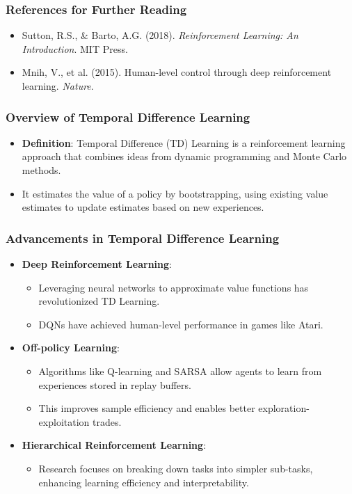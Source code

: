 \documentclass[aspectratio=169]{beamer}
\begin{document}
\begin{frame}[fragile]
    \frametitle{References for Further Reading}
    \begin{itemize}
        \item Sutton, R.S., \& Barto, A.G. (2018). \textit{Reinforcement Learning: An Introduction}. MIT Press.
        \item Mnih, V., et al. (2015). Human-level control through deep reinforcement learning. \textit{Nature}.
    \end{itemize}
\end{frame}

\begin{frame}[fragile]
    \frametitle{Overview of Temporal Difference Learning}
    \begin{itemize}
        \item \textbf{Definition}: Temporal Difference (TD) Learning is a reinforcement learning approach that combines ideas from dynamic programming and Monte Carlo methods.
        \item It estimates the value of a policy by bootstrapping, using existing value estimates to update estimates based on new experiences.
    \end{itemize}
\end{frame}

\begin{frame}[fragile]
    \frametitle{Advancements in Temporal Difference Learning}
    \begin{itemize}
        \item \textbf{Deep Reinforcement Learning}: 
        \begin{itemize}
            \item Leveraging neural networks to approximate value functions has revolutionized TD Learning. 
            \item DQNs have achieved human-level performance in games like Atari.
        \end{itemize}
        
        \item \textbf{Off-policy Learning}:
        \begin{itemize}
            \item Algorithms like Q-learning and SARSA allow agents to learn from experiences stored in replay buffers.
            \item This improves sample efficiency and enables better exploration-exploitation trades.
        \end{itemize}
        
        \item \textbf{Hierarchical Reinforcement Learning}:
        \begin{itemize}
            \item Research focuses on breaking down tasks into simpler sub-tasks, enhancing learning efficiency and interpretability.
        \end{itemize}
    \end{itemize}
\end{frame}
\end{document}
